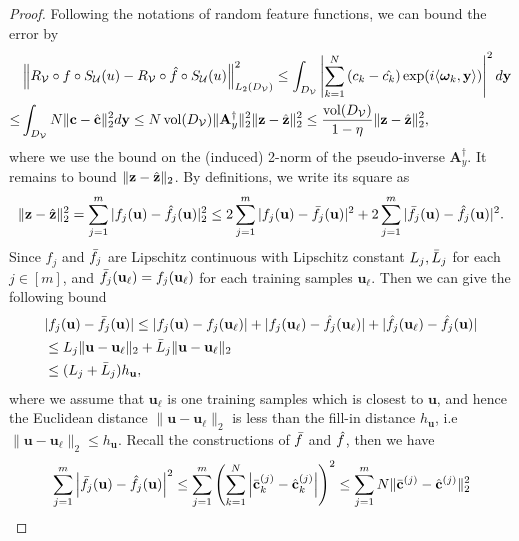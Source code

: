 \documentclass[10pt,a4paper]{amsart}
\newcommand{\Ab}{\mathbf{A}}
\newcommand{\Uc}{\mathcal{U}}
\newcommand{\Vc}{\mathcal{V}}
\newcommand{\cb}{\mathbf{c}}
\newcommand{\omegab}{\boldsymbol\omega}
\newcommand{\ub}{\mathbf{u}}
\newcommand{\vol}{\mathop{\mathrm{vol}}}
\newcommand{\yb}{\mathbf{y}}
\newcommand{\zb}{\mathbf{z}}
\begin{document}
\begin{proof}
Following the notations of random feature functions, we can bound the error by
\begin{equation}
\label{boundI2}
\begin{aligned}
& \left\|R_\Vc\circ f\circ S_\Uc(u) - R_\Vc\circ\Hat{f}\circ S_\Uc(u)\right\|^2_{L_2(D_\Vc)} \leq \int_{D_\Vc} \left|\sum_{k=1}^N \left(c_k - \Hat{c_k}\right) \exp(i\langle \omegab_k,\yb\rangle) \right|^2 d\yb \\
\leq & \int_{D_\Vc} N \|\cb-\Hat{\cb}\|^2_2 d\yb 
\leq N\vol(D_\Vc)\|\Ab_y^\dagger\|_2^2 \|\zb-\Hat{\zb}\|_2^2 
\leq \frac{\vol(D_\Vc)}{1-\eta}\|\zb-\Hat{\zb}\|_2^2,
\end{aligned}
\end{equation}
where we use the bound on the (induced) 2-norm of the pseudo-inverse $\Ab_y^\dagger$.
It remains to bound $\|\zb-\Hat{\zb}\|_2$. By definitions, we write its square as
\begin{equation*}
\|\zb-\Hat{\zb}\|_2^2 = \sum_{j=1}^m |f_j(\ub) - \Hat{f}_j(\ub)|_2^2 \leq 2\sum_{j=1}^m |f_j(\ub) - \Bar{f}_j(\ub)|^2 + 2\sum_{j=1}^m |\Bar{f}_j(\ub) - \Hat{f}_j(\ub)|^2.
\end{equation*}
Since $f_j$ and $\Bar{f}_j$ are Lipschitz continuous with Lipschitz constant $L_j, \Bar{L}_j$ for each $j\in[m]$, and $\Bar{f}_j(\ub_\ell) = f_j(\ub_\ell)$ for each training samples $\ub_\ell$. Then we can give the following bound
\begin{equation*}
\begin{aligned}
& |f_j(\ub) - \Bar{f}_j(\ub)| \leq |f_j(\ub) - f_j(\ub_\ell)| + |f_j(\ub_\ell) - \Hat{f}_j(\ub_\ell)| + |\Hat{f}_j(\ub_\ell) - \Hat{f}_j(\ub)|   \\
& \leq L_j \|\ub-\ub_\ell\|_2 + \Bar{L}_j\|\ub-\ub_\ell\|_2 \\
& \leq  (L_j + \Bar{L}_j) h_\ub,
\end{aligned}
\end{equation*}
where we assume that $\ub_\ell$ is one training samples which is closest to $\ub$, and hence the Euclidean distance $\|\ub-\ub_\ell\|_2$ is less than the fill-in distance $h_\ub$, i.e $\|\ub-\ub_\ell\|_2 \leq h_\ub$.
Recall the constructions of $\Bar{f}$ and $\Hat{f}$, then we have
\begin{equation*}
\begin{aligned}
& \sum_{j=1}^m \left|\Bar{f}_j(\ub) - \Hat{f}_j(\ub)\right|^2 \leq \sum_{j=1}^m \left( \sum_{k=1}^N \left|\Bar{\cb}_k^{(j)} - \Hat{\cb}_k^{(j)}\right|\right)^2 \leq \sum_{j=1}^m N\|\Bar{\cb}^{(j)} - \Hat{\cb}^{(j)}\|_2^2 \\

\end{aligned}
\end{equation*}
\end{proof}
\end{document}
